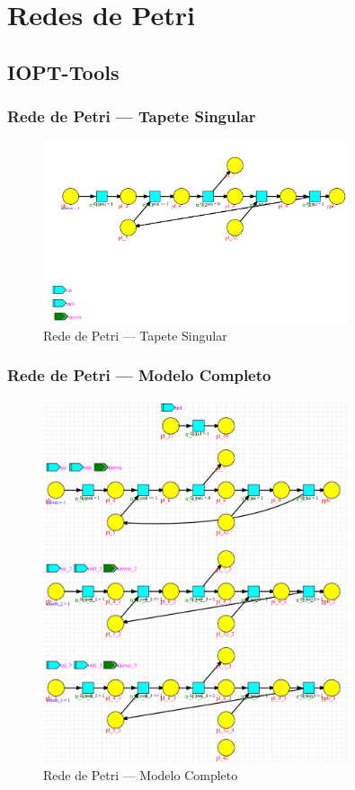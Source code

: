 \usepackage{hyperref}

\section{Redes de Petri}

\subsection{IOPT-Tools}

\subsubsection{Rede de Petri --- Tapete Singular}
\begin{figure}[H]
    \centering
    \includegraphics[width=0.8\textwidth]{img/petri_tapete_singular.png}
    \caption{Rede de Petri --- Tapete Singular}\label{fig:petri_tapete_singular}
\end{figure}

\subsubsection{Rede de Petri --- Modelo Completo}
\begin{figure}[H]
    \centering
    \includegraphics[width=0.8\textwidth]{img/petri_modelo_completo.png}
    \caption{Rede de Petri --- Modelo Completo}\label{fig:petri_modelo_completo}
\end{figure}


